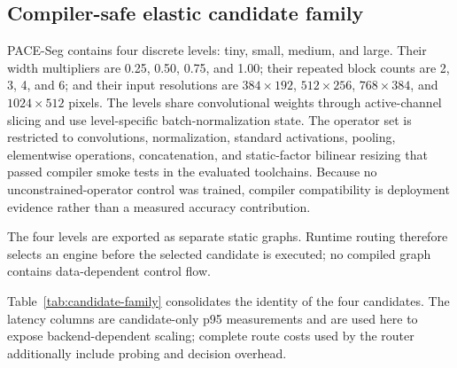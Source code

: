 \documentclass[a4paper,review,12pt]{elsarticle}
\newcommand{\method}{PACE-Seg}
\begin{document}
\subsection{Compiler-safe elastic candidate family}
\label{sec:elastic}

\method{} contains four discrete levels: tiny, small, medium, and large. Their width multipliers are 0.25, 0.50, 0.75, and 1.00; their repeated block counts are 2, 3, 4, and 6; and their input resolutions are $384\times192$, $512\times256$, $768\times384$, and $1024\times512$ pixels. The levels share convolutional weights through active-channel slicing and use level-specific batch-normalization state. The operator set is restricted to convolutions, normalization, standard activations, pooling, elementwise operations, concatenation, and static-factor bilinear resizing that passed compiler smoke tests in the evaluated toolchains. Because no unconstrained-operator control was trained, compiler compatibility is deployment evidence rather than a measured accuracy contribution.

The four levels are exported as separate static graphs. Runtime routing therefore selects an engine before the selected candidate is executed; no compiled graph contains data-dependent control flow.

Table~\ref{tab:candidate-family} consolidates the identity of the four candidates. The latency columns are candidate-only p95 measurements and are used here to expose backend-dependent scaling; complete route costs used by the router additionally include probing and decision overhead.

\begin{table}[H]
\centering
\caption{Elastic candidate family. Parameter counts refer to the extracted static PyTorch subnet, including batch-normalization affine parameters. Candidate-only p95 latency is measured from compiled FP16 graphs on E1 (Hailo-8) and E3 (TensorRT/CUDA); it is not the complete routed latency reported in RQ3.}
\label{tab:candidate-family}
\small
{}
\end{table}
\end{document}
